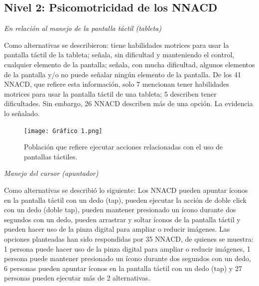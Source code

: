 \documentclass[spanish]{textolivre}
\begin{document}
\subsection{Nivel 2: Psicomotricidad de los NNACD}\label{sec-formato}
\textit{En relación al manejo de la pantalla táctil (tableta)}

Como alternativas se describieron: tiene habilidades motrices para usar la pantalla táctil de la tableta; señala, sin dificultad y manteniendo el control, cualquier elemento de la pantalla; señala, con mucha dificultad, algunos elementos de la pantalla y/o no puede señalar ningún elemento de la pantalla. De los 41 NNACD, que refiere esta información, solo 7 mencionan tener habilidades motrices para usar la pantalla táctil de una tableta; 5 describen tener dificultades. Sin embargo, 26 NNACD describen más de una opción. La  evidencia lo señalado.

\begin{figure}[h!]
 \centering
 \texttt{[image: Gráfico 1.png]}
 \caption{Población que refiere ejecutar acciones relacionadas con el uso de pantallas táctiles.}
 \label{fig02}
\end{figure}

\textit{Manejo del cursor (apuntador)}

Como alternativas se describió lo siguiente: Los NNACD pueden apuntar íconos en la pantalla táctil con un dedo (tap), pueden ejecutar la acción de doble click con un dedo (doble tap), pueden mantener presionado un ícono durante dos segundos con un dedo, pueden arrastrar y soltar íconos de la pantalla táctil y pueden hacer uso de la pinza digital para ampliar o reducir imágenes. Las opciones planteadas han sido respondidas por 35 NNACD, de quienes se muestra: 1 persona puede hacer uso de la pinza digital para ampliar o reducir imágenes, 1 persona puede mantener presionado un ícono durante dos segundos con un dedo, 6 personas pueden apuntar íconos en la pantalla táctil con un dedo (tap) y 27 personas pueden ejecutar más de 2 alternativas.
\end{document}
